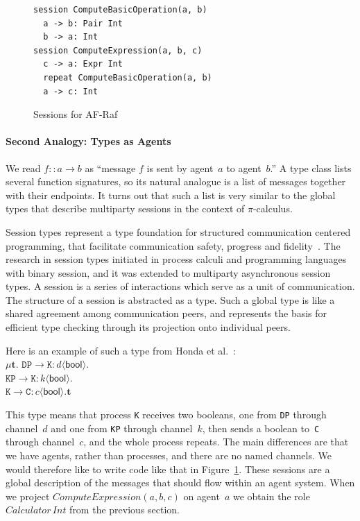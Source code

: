 \documentclass[a4paper,12pt,oneside,fleqn]{book} %
\begin{document}
{\begin{figure}\footnotesize %
\begin{verbatim}
session ComputeBasicOperation(a, b)
  a -> b: Pair Int
  b -> a: Int
session ComputeExpression(a, b, c)
  c -> a: Expr Int
  repeat ComputeBasicOperation(a, b)
  a -> c: Int
\end{verbatim}
\caption{Sessions for AF-Raf}\label{fig:sessions}
\end{figure} %

{\def\l#1->#2:#3<#4>{\mathtt{#1}\to\mathtt{#2}:#3\langle\mathsf{#4}\rangle}
\paragraph{Second Analogy: Types as Agents} We read $f::a\to b$ as
``message $f$ is sent by agent~$a$ to agent~$b$.'' A type class lists
several function signatures, so its natural analogue is a list of messages
together with their endpoints. It turns out that such a list is very
similar to the global types that describe multiparty sessions in the
context of $\pi$-calculus.

Session types represent a type foundation for structured communication
centered programming, that facilitate communication safety, progress and
fidelity~\cite{dblp:conf/popl/hondayc08}. The research in session types
initiated in process calculi and programming languages with binary session,
and it was extended to multiparty asynchronous session types. A session is
a series of interactions which serve as a unit of communication. The
structure of a session is abstracted as a type. Such a global type is like
a shared agreement among communication peers, and represents the basis for
efficient type checking through its projection onto individual peers.



Here is an example of such a type from
Honda et al.~\cite{dblp:conf/popl/hondayc08}:\\
$\mu\mathbf{t}.$
  $\l DP->K:d<bool>. $\\
  $\l KP->K:k<bool>. $\\
  $\l K->C:c<bool>.\mathbf{t}$

This type means that process \texttt{K} receives two booleans, one from
\texttt{DP} through channel~$d$ and one from \texttt{KP} through channel~$k$,
then sends a boolean to~\texttt{C} through channel~$c$, and the whole process
repeats. The main differences are that we have agents, rather than processes,
and there are no named channels. We would therefore like to write code like
that in Figure~\ref{fig:sessions}.  These sessions are a global description of
the messages that should flow within an agent system. When we project
$\mathit{ComputeExpression}(a,b,c)$ on agent~$a$ we obtain the role
$\mathit{Calculator}\,\mathit{Int}$ from the previous section.}

}
\end{document}
